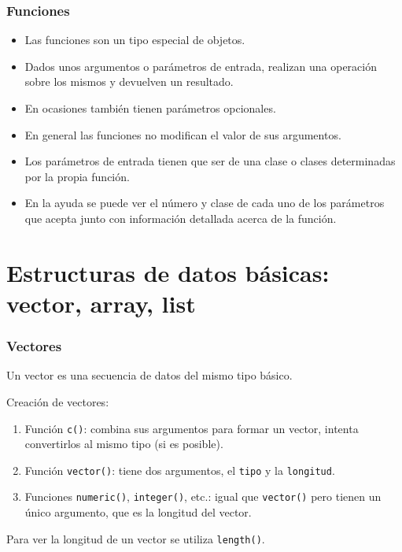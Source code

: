 \documentclass{beamer}
\newenvironment{wideitemize}{\itemize\addtolength{\itemsep}{10pt}}{\enditemize}
\begin{document}
\begin{frame}
\frametitle{Funciones}

\begin{itemize}

\item Las funciones son un tipo especial de objetos.

\item Dados unos argumentos o parámetros de entrada, realizan una operación sobre los mismos y devuelven un resultado.

\item En ocasiones también tienen parámetros opcionales.

\item En general las funciones no modifican el valor de sus argumentos.

\item Los parámetros de entrada tienen que ser de una clase o clases determinadas por la propia función.

\item En la ayuda se puede ver el número y clase de cada uno de los parámetros que acepta junto con información detallada acerca de la función.
\end{itemize}
\end{frame}



\section{Estructuras de datos básicas: vector, array, list}

\begin{frame}
\frametitle{Vectores}
\begin{wideitemize}
\item Un vector es una secuencia de datos del mismo tipo básico.
\item Creación de vectores:
\begin{enumerate}
\item Función \texttt{c()}: combina sus argumentos para formar un vector, intenta convertirlos al mismo tipo (si es posible).
\item Función \texttt{vector()}: tiene dos argumentos, el \texttt{tipo} y la \texttt{longitud}.
\item Funciones \texttt{numeric()}, \texttt{integer()}, etc.: igual que \texttt{vector()} pero tienen un único argumento, que es la longitud del vector.
\end{enumerate}
\item Para ver la longitud de un vector se utiliza \texttt{length()}.
\end{wideitemize}
\end{frame}
\end{document}
